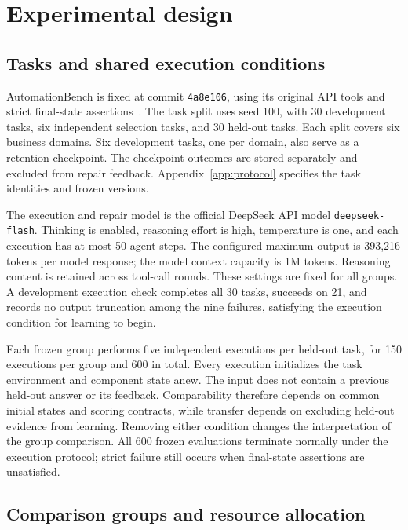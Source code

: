 \documentclass{ecai}
\begin{document}
\section{Experimental design}
\label{sec:design}

\subsection{Tasks and shared execution conditions}

AutomationBench is fixed at commit \texttt{4a8e106}, using its original API tools and strict final-state assertions~\cite{automationbench}. The task split uses seed 100, with 30 development tasks, six independent selection tasks, and 30 held-out tasks. Each split covers six business domains. Six development tasks, one per domain, also serve as a retention checkpoint. The checkpoint outcomes are stored separately and excluded from repair feedback. Appendix~\ref{app:protocol} specifies the task identities and frozen versions.

The execution and repair model is the official DeepSeek API model \texttt{deepseek-flash}. Thinking is enabled, reasoning effort is high, temperature is one, and each execution has at most 50 agent steps. The configured maximum output is 393,216 tokens per model response; the model context capacity is 1M tokens. Reasoning content is retained across tool-call rounds. These settings are fixed for all groups. A development execution check completes all 30 tasks, succeeds on 21, and records no output truncation among the nine failures, satisfying the execution condition for learning to begin.

Each frozen group performs five independent executions per held-out task, for 150 executions per group and 600 in total. Every execution initializes the task environment and component state anew. The input does not contain a previous held-out answer or its feedback. Comparability therefore depends on common initial states and scoring contracts, while transfer depends on excluding held-out evidence from learning. Removing either condition changes the interpretation of the group comparison. All 600 frozen evaluations terminate normally under the execution protocol; strict failure still occurs when final-state assertions are unsatisfied.

\subsection{Comparison groups and resource allocation}
\end{document}
